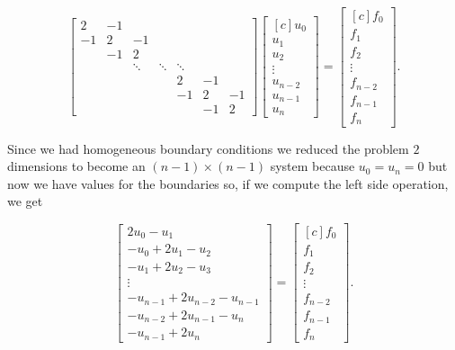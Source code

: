 \documentclass[fontsize=11pt,paper=a4,titlepage]{report}
\begin{document}
\begin{displaymath}
\begin{bmatrix}
	2 & -1 &  &  &  &  &  \\
	-1 & 2 & -1 &  &  &  &  \\
	 & -1 & 2 &  &  &  &  \\
	 &  & \ddots & \ddots & \ddots &  & \\
	 &  &  &  & 2 & -1 &  \\
	 &  &  &  & -1 & 2 & -1 \\
	 &  &  &  &  & -1 & 2
\end{bmatrix}
\begin{bmatrix*}[c]
	u_0 \\
	u_1 \\
	u_2 \\
	\vdots \\
	u_{n - 2} \\
	u_{n - 1} \\
	u_n
\end{bmatrix*}
=
\begin{bmatrix*}[c]
	f_0 \\
	f_1 \\
	f_2 \\
	\vdots \\
	f_{n - 2} \\
	f_{n - 1} \\
	f_n
\end{bmatrix*}.
\end{displaymath}

Since we had homogeneous boundary conditions we reduced the problem $2$ 
dimensions to become an $(n - 1) \times (n - 1)$ system because $u_0 = u_n = 0$ 
but now we have values for the boundaries so, if we compute the left side 
operation, we get

\begin{displaymath}
\begin{bmatrix}
	2u_0 - u_1 \\
	- u_0 + 2u_1 - u_2 \\
	- u_1 + 2u_2 - u_3 \\
	\vdots \\
	- u_{n - 1} + 2u_{n - 2} - u_{n - 1} \\
	- u_{n - 2} + 2u_{n - 1} - u_{n} \\
	- u_{n - 1} + 2u_n
\end{bmatrix}
=
\begin{bmatrix*}[c]
	f_0 \\
	f_1 \\
	f_2 \\
	\vdots \\
	f_{n - 2} \\
	f_{n - 1} \\
	f_n
\end{bmatrix*}.
\end{displaymath}
\end{document}
